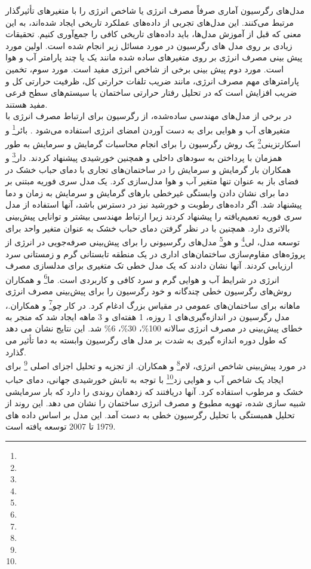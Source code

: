 مدل‌های رگرسیون آماری صرفاً مصرف انرژی یا شاخص انرژی را با متغیرهای تأثیرگذار مرتبط می‌کنند. این مدل‌های تجربی از داده‌های عملکرد تاریخی ایجاد شده‌اند، به این معنی که قبل از آموزش مدل‌ها، باید داده‌های تاریخی کافی را جمع‌آوری کنیم. تحقیقات زیادی بر روی مدل های رگرسیون در مورد مسائل زیر انجام شده است. اولین مورد پیش بینی مصرف انرژی بر روی متغیرهای ساده شده مانند یک یا چند پارامتر آب و هوا است. مورد دوم پیش بینی برخی از شاخص انرژی مفید است. مورد سوم، تخمین پارامترهای مهم مصرف انرژی، مانند ضریب تلفات حرارتی کل، ظرفیت حرارتی کل و ضریب افزایش است که در تحلیل رفتار حرارتی ساختمان یا سیستم‌های سطح فرعی مفید هستند.
\\
در برخی از مدل‌های مهندسی ساده‌شده، از رگرسیون برای ارتباط مصرف انرژی با متغیرهای آب و هوایی برای به دست آوردن امضای انرژی استفاده می‌شود \cite{pfafferott2005thermal,bauer1998simplified}. بائر\footnote{} و اسکارتزینی\footnote{} \cite{bauer1998simplified} یک روش رگرسیون را برای انجام محاسبات گرمایش و سرمایش به طور همزمان با پرداختن به سودهای داخلی و همچنین خورشیدی پیشنهاد کردند. دار\footnote{} و همکاران \cite{dhar1998modeling,dhar1999fourier} بار گرمایش و سرمایش را در ساختمان‌های تجاری با دمای حباب خشک در فضای باز به عنوان تنها متغیر آب و هوا مدل‌سازی کرد. یک مدل سری فوریه مبتنی بر دما برای نشان دادن وابستگی غیرخطی بارهای گرمایش و سرمایش به زمان و دما پیشنهاد شد. اگر داده‌های رطوبت و خورشید نیز در دسترس باشد، آنها استفاده از مدل سری فوریه تعمیم‌یافته را پیشنهاد کردند زیرا ارتباط مهندسی بیشتر و توانایی پیش‌بینی بالاتری دارد. همچنین با در نظر گرفتن دمای حباب خشک به عنوان متغیر واحد برای توسعه مدل، لی\footnote{} و هو\footnote{} \cite{lei2009baseline} مدل‌های رگرسیونی را برای پیش‌بینی صرفه‌جویی در انرژی از پروژه‌های مقاوم‌سازی ساختمان‌های اداری در یک منطقه تابستانی گرم و زمستانی سرد ارزیابی کردند. آنها نشان دادند که یک مدل خطی تک متغیری برای مدلسازی مصرف انرژی در شرایط آب و هوایی گرم و سرد کافی و کاربردی است. ما\footnote{} و همکاران\cite{ma2010study} روش‌های رگرسیون خطی چندگانه و خود رگرسیون را برای پیش‌بینی مصرف انرژی ماهانه برای ساختمان‌های عمومی در مقیاس بزرگ ادغام کرد. در کار چو\footnote{} و همکاران.\cite{cho2004effect}، مدل رگرسیون در اندازه‌گیری‌های 1 روزه، 1 هفته‌ای و 3 ماهه ایجاد شد که منجر به خطای پیش‌بینی در مصرف انرژی سالانه 100\%، 30\%، 6\% شد. این نتایج نشان می دهد که طول دوره اندازه گیری به شدت بر مدل های رگرسیون وابسته به دما تأثیر می گذارد.
\\
در مورد پیش‌بینی شاخص انرژی، لام\footnote{} و همکاران.\cite{lam2010principal} از تجزیه و تحلیل اجزای اصلی \footnote{} برای ایجاد یک شاخص آب و هوایی زد\footnote{} با توجه به تابش خورشیدی جهانی، دمای حباب خشک و مرطوب استفاده کرد. آنها دریافتند که زد\footnotemark[10] همان روندی را دارد که بار سرمایشی شبیه سازی شده، تهویه مطبوع و مصرف انرژی ساختمان را نشان می دهد. این روند از تحلیل همبستگی با تحلیل رگرسیون خطی به دست آمد. این مدل بر اساس داده های 1979 تا 2007 توسعه یافته است.

